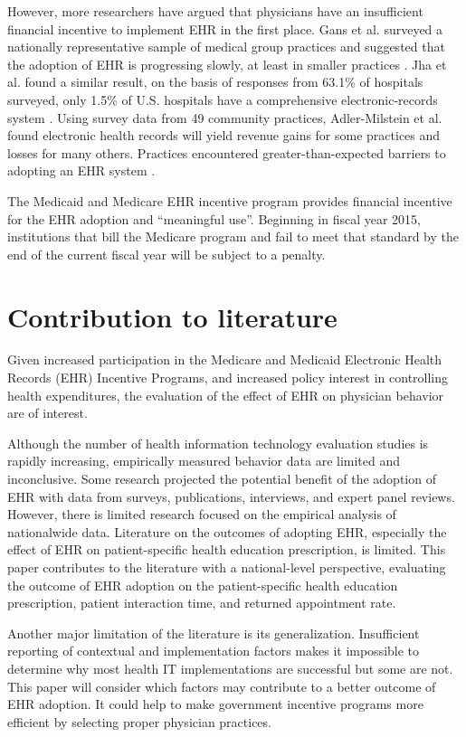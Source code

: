 \documentclass[12pt]{report}
\begin{document}
However, more researchers have argued that physicians have an insufficient financial incentive to implement EHR in the first place. Gans et al. surveyed a nationally representative sample of medical group practices and suggested that the adoption of EHR is progressing slowly, at least in smaller practices \citep{Gans2005}. Jha et al. found a similar result, on the basis of responses from 63.1\% of hospitals surveyed, only 1.5\% of U.S. hospitals have a comprehensive electronic-records system \citep{Jha2009}. Using survey data from 49 community practices, Adler-Milstein et al. found electronic health records will yield revenue gains for some practices and losses for many others. Practices encountered greater-than-expected barriers to adopting an EHR system \citep{Adler-Milstein2012}.

The Medicaid and Medicare EHR incentive program provides financial incentive for the EHR adoption and ``meaningful use''. Beginning in fiscal year 2015, institutions that bill the Medicare program and fail to meet that standard by the end of the current fiscal year will be subject to a penalty. 

\section{Contribution to literature}

Given increased participation in the Medicare and Medicaid Electronic Health Records (EHR) Incentive Programs, and increased policy interest in controlling health expenditures, the evaluation of the effect of EHR on physician behavior are of interest.

Although the number of health information technology evaluation studies is rapidly increasing, empirically measured behavior data are limited and inconclusive. Some research projected the potential benefit of the adoption of EHR with data from surveys, publications, interviews, and expert panel reviews. However, there is limited research focused on the empirical analysis of nationalwide data. Literature on the outcomes of adopting EHR, especially the effect of EHR on patient-specific health education prescription, is limited. This paper contributes to the literature with a national-level perspective, evaluating the outcome of EHR adoption on the patient-specific health education prescription, patient interaction time, and returned appointment rate.

Another major limitation of the literature is its generalization. Insufficient reporting of contextual and implementation factors makes it impossible to determine why most health IT implementations are successful but some are not. This paper will consider which factors may contribute to a better outcome of EHR adoption. It could help to make government incentive programs more efficient by selecting proper physician practices.
\end{document}
